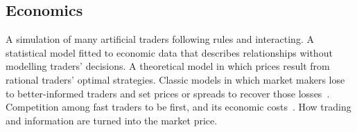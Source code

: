 \subsection{Economics}
\begin{description}[leftmargin=1.2em,style=sameline,itemsep=1pt,font=\normalfont\bfseries]
 A simulation of many artificial traders following rules and interacting.
 A statistical model fitted to economic data that describes
  relationships without modelling traders' decisions.
 A theoretical model in which prices result from rational traders' optimal
  strategies.
 Classic models in which market makers lose to better-informed
  traders and set prices or spreads to recover those losses~\citep{glosten1985,kyle1985}.
 Competition among fast traders to be first, and its economic
  costs~\citep{budish2015}.
 How trading and information are turned into the market price.
\end{description}
